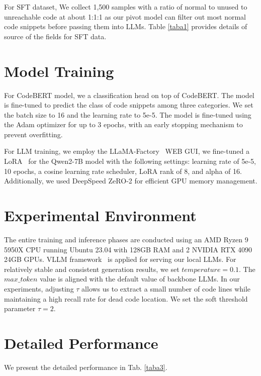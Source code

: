 \documentclass[11pt]{article}
\begin{document}
For SFT dataset, We collect 1,500 samples with a ratio of normal to unused to unreachable code at about 1:1:1 as our pivot model can filter out most normal code snippets before passing them into LLMs. Table \ref{taba1} provides details of source of the fields for SFT data.


\section{Model Training}
 For CodeBERT model, we a classification head on top of CodeBERT. The model is fine-tuned to predict the class of code snippets among three categories. We set the batch size to 16 and the learning rate to 5e-5. The model is fine-tuned using the Adam optimizer for up to 3 epochs, with an early stopping mechanism to prevent overfitting.

 For LLM training, we employ the LLaMA-Factory~\cite{zheng2024llamafactory} WEB GUI, we fine-tuned a LoRA~\cite{hulora} for the Qwen2-7B model with the following settings: learning rate of 5e-5, 10 epochs, a cosine learning rate scheduler, LoRA rank of 8, and alpha of 16. Additionally, we used DeepSpeed ZeRO-2 for efficient GPU memory management.

\section{Experimental Environment}
The entire training and inference phases are conducted using an AMD Ryzen 9 5950X CPU running Ubuntu 23.04 with 128GB RAM and 2 NVIDIA RTX 4090 24GB GPUs. VLLM framework~\cite{kwon2023efficient} is applied for serving our local LLMs. For relatively stable and consistent generation results, we set $temperature = 0.1$. The $max\_token$ value is aligned with the default value of backbone LLMs. In our experiments, adjusting $\tau$ allows us to extract a small number of code lines while maintaining a high recall rate for dead code location. We set the soft threshold parameter $\tau = 2$.

\section{Detailed Performance}
We present the detailed performance in Tab. \ref{taba3}.
\end{document}
